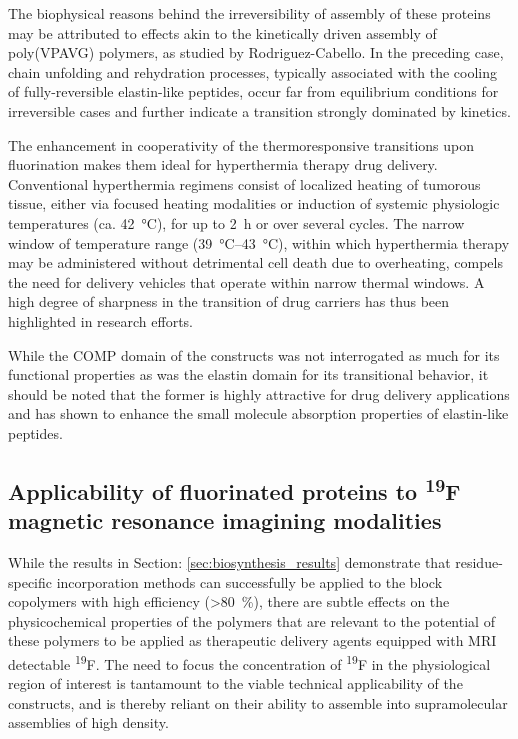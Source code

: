 \begin{refsection}
The biophysical reasons behind the irreversibility of assembly of these proteins
may be attributed to effects akin to the kinetically driven assembly of
poly(VPAVG) polymers, as studied by Rodriguez-Cabello.\cite{Reguera2003} In the
preceding case, chain unfolding and rehydration processes, typically associated
with the cooling of fully-reversible elastin-like peptides, occur far from
equilibrium conditions for irreversible cases and further indicate a transition
strongly dominated by kinetics.

The enhancement in cooperativity of the thermoresponsive transitions upon
fluorination makes them ideal for hyperthermia therapy drug
delivery.\cite{Furgeson2006} Conventional hyperthermia regimens consist of
localized heating of tumorous tissue, either via focused heating modalities or
induction of systemic physiologic temperatures (ca. \SI{42}{\celsius}), for up
to \SI{2}{\hour} or over several cycles.\cite{Chilkoti2002a,Dreher2007a}
The narrow window of temperature range (\SIrange{39}{43}{\celsius}), within which
hyperthermia therapy may be administered without detrimental cell death due to
overheating, compels the need for delivery vehicles that operate within narrow
thermal windows. A high degree of sharpness in the transition of drug carriers
has thus been highlighted in research efforts.\cite{Nakayama2010,Mackay2008} 

While the COMP domain of the constructs was not interrogated as much for its
functional properties as was the elastin domain for its transitional behavior,
it should be noted that the former is highly attractive for drug delivery
applications and has shown to enhance the small molecule absorption properties
of elastin-like peptides.\cite{Haghpanah2010}

\subsection{Applicability of fluorinated proteins to \textsuperscript{19}F
\label{sec:pff_app_mri}
magnetic resonance imagining modalities} 

While the results in Section: \ref{sec:biosynthesis_results} demonstrate that
residue-specific incorporation methods can successfully be applied to the block
copolymers with high efficiency (\textgreater \SI{80}{\percent}), there are
subtle effects on the physicochemical properties of the polymers that are
relevant to the potential of these polymers to be applied as therapeutic
delivery agents equipped with MRI detectable \textsuperscript{19}F. The need to
focus the concentration of \textsuperscript{19}F in the physiological region of
interest is tantamount to the viable technical applicability of the constructs,
and is thereby reliant on their ability to assemble into supramolecular assemblies of
high density.


\end{refsection}
